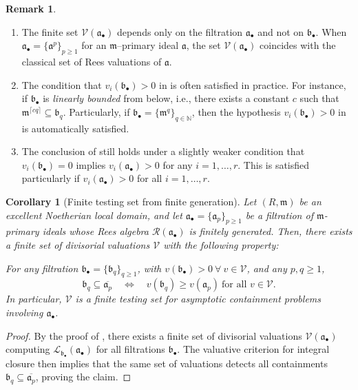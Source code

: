 \documentclass[12pt]{amsart}
\newcommand{\NN}{\mathbb{N}}
\newcommand{\m}{\mathfrak m}
\renewcommand{\a}{\mathfrak{a}}
\renewcommand{\b}{\mathfrak{b}}
\newcommand{\R}{\mathcal{R}}
\newcommand{\Loj}{\mathcal{L}} %
\newcommand{\abul}{{\a_\bullet}}
\newcommand{\bbul}{{\b_\bullet}}
\theoremstyle{plain}
\newtheorem{corollary}[theorem]{Corollary}
\theoremstyle{definition}
\newtheorem{remark}[theorem]{Remark}
\numberwithin{equation}{section}
\begin{document}
 
\begin{remark} \label{rmk:finite-testing-fingen} \quad
	\begin{enumerate} 
	\item The finite set $\mathcal V(\abul)$ depends only on the filtration $\abul$
	and not on $\bbul$.
	When $\abul=\{\a^p\}_{p\ge1}$ for an $\m$--primary ideal $\a$, the set
	$\mathcal V(\abul)$ coincides with the classical set of Rees valuations
	of $\a$.
	\item The condition that $v_i(\bbul) > 0$ in  is often satisfied in practice. For instance, if $\bbul$ is \emph{linearly bounded} from below, i.e., there exists a constant $c$ such that
	$\m^{\lceil cq \rceil} \subseteq \b_q.$
	Particularly, if $\bbul = \{\m^q\}_{q \in \NN}$, then the hypothesis $v_i(\bbul) > 0$ in  is automatically satisfied.
	\item The conclusion of  still holds under a slightly weaker condition that $v_i(\bbul) = 0$ implies $v_i(\abul) > 0$ for any $i =1, \dots, r$. This is satisfied particularly if $v_i(\abul) > 0$ for all $i = 1, \dots, r$.
	\end{enumerate}
\end{remark}

\begin{corollary}[Finite testing set from finite generation]
	\label{prop:finite-testing-fingen}
	Let $(R,\m)$ be an excellent Noetherian local domain, and let
	$\abul=\{\a_p\}_{p\ge1}$ be a filtration of $\m$-primary ideals whose Rees algebra
	$\R(\abul)$ is finitely generated.
	Then, there exists a finite set of divisorial valuations $\mathcal V$
	with the following property:
	
	For any filtration $\bbul=\{\b_q\}_{q\ge1}$, with $v(\bbul) > 0 \ \forall \ v \in \mathcal V$, and any $p,q\ge1$,
	\[
	\b_q\subseteq \overline{\a_p}
	\quad\Longleftrightarrow\quad
	v(\b_q)\ge v(\a_p)
	\ \text{for all } v\in\mathcal V.
	\]
	In particular, $\mathcal V$ is a finite testing set for asymptotic
	containment problems involving $\abul$.
\end{corollary}

\begin{proof}
	By the proof of , there exists a finite set of
	divisorial valuations $\mathcal V(\abul)$ computing
	$\Loj_{\bbul}(\abul)$ for all filtrations $\bbul$.
	The valuative criterion for integral closure then implies that the same
	set of valuations detects all containments
	$\b_q\subseteq\overline{\a_p}$, proving the claim.
\end{proof}
	
\end{document}
